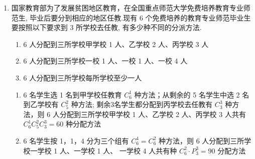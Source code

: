 \begin{enumerate}
\begin{enumerate}
\begin{jieda}
\begin{enumerate}
                根据分步计数原理，一共有 ${{C}}_{6}^{1}{{C}}_{5}^{2}{{C}}_{3}^{3} = {60}$ 种不同分法.
                
                \item 可以分为三类情况:
                所以一共有 ${90} + {360} + {90} = {540}$ 种不同分法.
            \end{enumerate}
        \end{jieda}
        \item 国家教育部为了发展贫困地区教育，在全国重点师范大学免费培养教育专业师范生, 毕业后要分到相应的地区任教.现有 6 个免费培养的教育专业师范毕业生要按照以下要求到 3 所学校去任教, 有多少种不同的分派方法.
        \begin{enumerate}
            \item 6 人分配到三所学校甲学校 1 人、乙学校 2 人、丙学校 3 人
            
            \item 6 人分配到三所学校一校 1 人、一校 1 人、一校 4 人
            
            \item 6 人分配到三所学校每所学校至少一人
        \end{enumerate}
        \begin{jieda}
            \begin{enumerate}
                \item 6 名学生选 1 名到甲学校任教育 ${{C}}_{6}^{1}$ 种方法；从剩余的 5 名学生中选 2 名到乙学校有 ${{C}}_{5}^{2}$ 种方法; 剩余3名学生都分配到丙学校去任教有 ${{C}}_{3}^{3}$ 种方法，则 6 人分配到三所学校甲学校 1 人、乙学校 2 人、丙学校 3 人共有 ${{C}}_{6}^{1}{{C}}_{5}^{2}{{C}}_{3}^{3} = {60}$ 种分配方法

                \item 6 名学生按 1，1，4 分为三个组有 ${{C}}_{6}^{4} = {{C}}_{6}^{2}$ 种方法，则 6 人分配到三所学校一学校 1 人、一学校 1 人、 一学校 4 人共有种 ${{C}}_{6}^{2} \cdot  P_{3}^{3} = {90}$ 分配方法
                

\end{enumerate}
\end{jieda}
\end{enumerate}
\end{enumerate}
